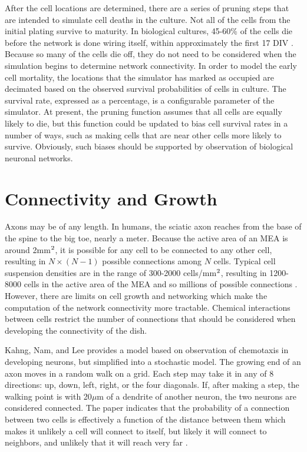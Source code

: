 \documentclass[letterpaper]{article}
\newcommand{\superscript}[1]{\ensuremath{^{\textrm{\scriptsize{#1}}}}}
\begin{document}
After the cell locations are determined, there are a series of pruning steps that are intended to simulate cell deaths in the culture. 
Not all of the cells from the initial plating survive to maturity. 
In biological cultures, 45-60\% of the cells die before the network is done wiring itself, within approximately the first 17 DIV \cite{erickson2008caged}.
Because so many of the cells die off, they do not need to be considered when the simulation begins to determine network connectivity. 
In order to model the early cell mortality, the locations that the simulator has marked as occupied are decimated based on the observed survival probabilities of cells in culture. 
The survival rate, expressed as a percentage, is a configurable parameter of the simulator. 
At present, the pruning function assumes that all cells are equally likely to die, but this function could be updated to bias cell survival rates in a number of ways, such as making cells that are near other cells more likely to survive. 
Obviously, such biases should be supported by observation of biological neuronal networks. 


\section{Connectivity and Growth}

Axons may be of any length. 
In humans, the sciatic axon reaches from the base of the spine to the big toe, nearly a meter. 
Because the active area of an MEA is around 2mm\superscript{2}, it is possible for any cell to be connected to any other cell, resulting in $N\times(N-1)$ possible connections among $N$ cells. 
Typical cell suspension densities are in the range of 300-2000 cells/mm\superscript{2}, resulting in 1200-8000 cells in the active area of the MEA and so millions of possible connections \cite{wagenaar2006extremely}.
However, there are limits on cell growth and networking which make the computation of the network connectivity more tractable. 
Chemical interactions between cells restrict the number of connections that should be considered when developing the connectivity of the dish. 

Kahng, Nam, and Lee \citeyear{kahng2007stochastic} provides a model based on observation of chemotaxis in developing neurons, but simplified into a stochastic model. 
The growing end of an axon moves in a random walk on a grid. 
Each step may take it in any of 8 directions: up, down, left, right, or the four diagonals.
If, after making a step, the walking point is with 20$\mu$m of a dendrite of another neuron, the two neurons are considered connected. 
The paper indicates that the probability of a connection between two cells is effectively a function of the distance between them which makes it unlikely a cell will connect to itself, but likely it will connect to neighbors, and unlikely that it will reach very far \cite{Segev2000185}. 
\end{document}
